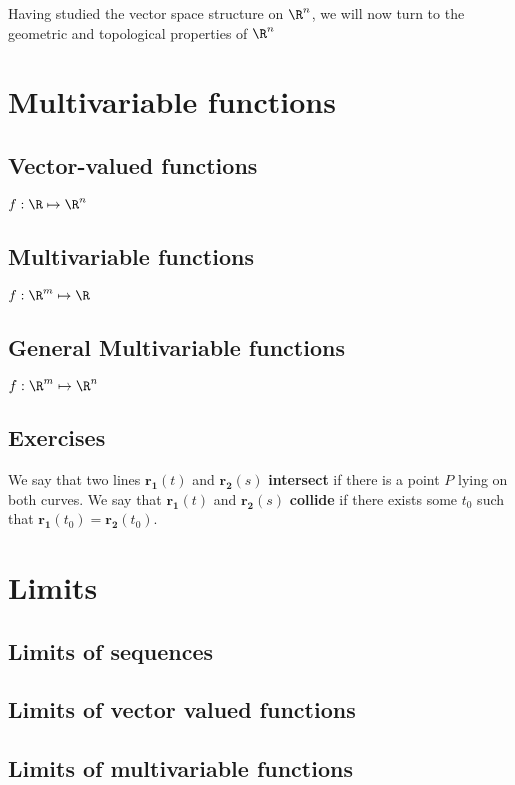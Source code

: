 Having studied the vector space structure on $\R^n$, we will now turn to the geometric and topological properties of $\R^n$

\section{Multivariable functions}

\subsection{Vector-valued functions}

$f : \R \mapsto \R^n$

\subsection{Multivariable functions}

$f : \R^m\mapsto \R$

\subsection{General Multivariable functions}

$f : \R^m\mapsto \R^n$

\subsection{Exercises}

We say that two lines $\bm{r_1}(t)$ and $\bm{r_2}(s)$ \textbf{intersect} if there is a point $P$ lying on both curves.  We say that $\bm{r_1}(t)$ and $\bm{r_2}(s)$ \textbf{collide} if there exists some $t_0$ such that $\bm{r_1}(t_0) = \bm{r_2}(t_0)$.


\section{Limits}

\subsection{Limits of sequences}

\subsection{Limits of vector valued functions}

\subsection{Limits of multivariable functions}

